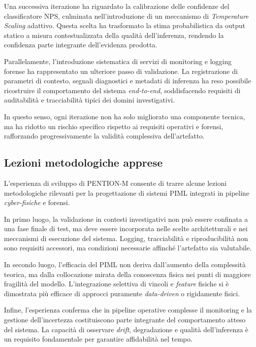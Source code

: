 Una successiva iterazione ha riguardato la calibrazione delle confidenze del classificatore NPS, culminata nell’introduzione di un meccanismo di \emph{Temperature Scaling} adattivo. Questa scelta ha trasformato la stima probabilistica da output statico a misura contestualizzata della qualità dell’inferenza, rendendo la confidenza parte integrante dell’evidenza prodotta.

Parallelamente, l’introduzione sistematica di servizi di monitoring e logging forense ha rappresentato un ulteriore passo di validazione. La registrazione di parametri di contesto, segnali diagnostici e metadati di inferenza ha reso possibile ricostruire il comportamento del sistema \textit{end-to-end}, soddisfacendo requisiti di auditabilità e tracciabilità tipici dei domini investigativi.

In questo senso, ogni iterazione non ha solo migliorato una componente tecnica, ma ha ridotto un rischio specifico rispetto ai requisiti operativi e forensi, rafforzando progressivamente la validità complessiva dell’artefatto.

\subsection{Lezioni metodologiche apprese}
\label{sec:exp_lessons}

L’esperienza di sviluppo di \textsc{PENTION-M} consente di trarre alcune lezioni metodologiche rilevanti per la progettazione di sistemi PIML integrati in pipeline \textit{cyber-fisiche} e forensi.

In primo luogo, la validazione in contesti investigativi non può essere confinata a una fase finale di test, ma deve essere incorporata nelle scelte architetturali e nei meccanismi di esecuzione del sistema. Logging, tracciabilità e riproducibilità non sono requisiti accessori, ma condizioni necessarie affinché l’artefatto sia valutabile.

In secondo luogo, l’efficacia del PIML non deriva dall’aumento della complessità teorica, ma dalla collocazione mirata della conoscenza fisica nei punti di maggiore fragilità del modello. L’integrazione selettiva di vincoli e \textit{feature} fisiche si è dimostrata più efficace di approcci puramente \textit{data-driven} o rigidamente fisici.

Infine, l’esperienza conferma che in pipeline operative complesse il monitoring e la gestione dell’incertezza costituiscono parte integrante del comportamento atteso del sistema. La capacità di osservare \textit{drift}, degradazione e qualità dell’inferenza è un requisito fondamentale per garantire affidabilità nel tempo.

